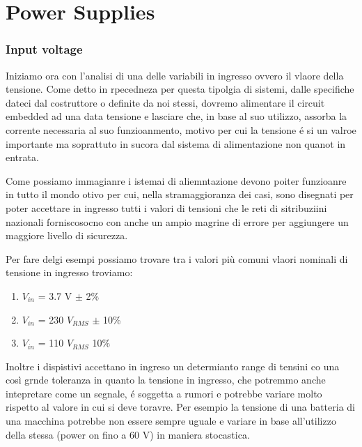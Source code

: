 \documentclass[../main.tex]{subfiles}
\begin{document}
\clearpage
\thispagestyle{empty}

\vspace*{7cm}
\section{Power Supplies}
\vspace*{1.5cm}


\subsubsection*{Input voltage}

Iniziamo ora con l'analisi di una delle variabili in ingresso ovvero il vlaore della tensione. Come detto in rpecedneza per questa tipolgia di sistemi, dalle specifiche dateci dal costruttore o definite da noi stessi, dovremo alimentare il circuit embedded ad una data tensione e lasciare che, in base al suo utilizzo, assorba la corrente necessaria al suo funzioanmento, motivo per cui la tensione é si un valroe importante ma soprattuto in sucora dal sistema di alimentazione non quanot in entrata.

Come possiamo immagianre i istemai di aliemntazione devono poiter funzioanre in tutto il mondo otivo per cui, nella stramaggioranza dei casi, sono disegnati per poter accettare in ingresso tutti i valori di tensioni che le reti di sitribuziini nazionali forniscosocno con anche un ampio magrine di errore per aggiungere un maggiore livello di sicurezza.

Per fare delgi esempi possiamo trovare tra i valori più comuni vlaori nominali di tensione in ingresso troviamo:

\begin{enumerate}
	\item[\textbf{-}] $V_{in}$ = 3.7 V $\pm$ 2\%
	\item[\textbf{-}] $V_{in}$ = 230 $\unit{V_{RMS}}$ $\pm$ 10\%
	\item[\textbf{-}] $V_{in}$ = 110 $\unit{V_{RMS}}$ 10\%
\end{enumerate}

Inoltre i dispistivi accettano in ingreso un determianto range di tensini co una così grnde toleranza in quanto la tensione in ingresso, che potremmo anche intepretare come un segnale, é soggetta a rumori e potrebbe variare molto rispetto al valore in cui si deve toravre. Per esempio la tensione di una batteria di una macchina potrebbe non essere sempre  uguale e variare in base all'utilizzo della stessa (power on fino a 60 V) in maniera stocastica.
\end{document}
